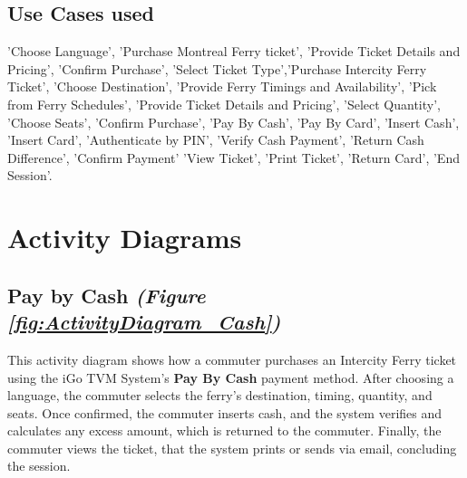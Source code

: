 \documentclass[letterpaper]{report}
\begin{document}
\subsection{Use Cases used}
'Choose Language', 'Purchase Montreal Ferry ticket', 'Provide Ticket Details and Pricing', 'Confirm Purchase', 'Select Ticket Type','Purchase Intercity Ferry Ticket', 'Choose Destination', 'Provide Ferry Timings and Availability', 'Pick from Ferry Schedules', 'Provide Ticket Details and Pricing', 'Select Quantity', 'Choose Seats', 'Confirm Purchase', 'Pay By Cash', 'Pay By Card', 'Insert Cash', 'Insert Card', 'Authenticate by PIN', 'Verify Cash Payment', 'Return Cash Difference', 'Confirm Payment' 'View Ticket', 'Print Ticket', 'Return Card', 'End Session'.

\section{Activity Diagrams}
\subsection{Pay by Cash \emph{(Figure \ref{fig:ActivityDiagram_Cash})}}
This activity diagram shows how a commuter purchases an Intercity Ferry ticket using the iGo TVM System's {\bf Pay By Cash} payment method. After choosing a language, the commuter selects the ferry's destination, timing, quantity, and seats. Once confirmed, the commuter inserts cash, and the system verifies and calculates any excess amount, which is returned to the commuter. Finally, the commuter views the ticket, that the system prints or sends via email, concluding the session.
\vspace{\baselineskip}
 
\end{document}
